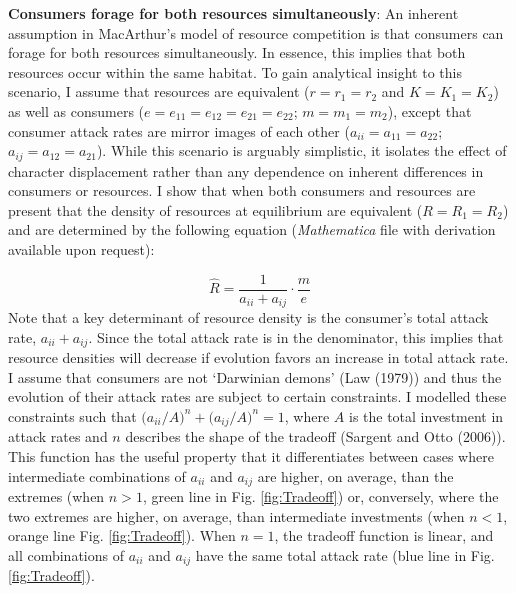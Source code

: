 \documentclass[11pt,]{article}
\begin{document}
\textbf{Consumers forage for both resources simultaneously}: An inherent
assumption in MacArthur's model of resource competition is that
consumers can forage for both resources simultaneously. In essence, this
implies that both resources occur within the same habitat. To gain
analytical insight to this scenario, I assume that resources are
equivalent (\(r=r_1=r_2\) and \(K=K_1=K_2\)) as well as consumers
(\(e=e_{11}=e_{12}=e_{21}=e_{22}\); \(m=m_1=m_2\)), except that consumer
attack rates are mirror images of each other (\(a_{ii}=a_{11}=a_{22}\);
\(a_{ij}=a_{12}=a_{21}\)). While this scenario is arguably simplistic,
it isolates the effect of character displacement rather than any
dependence on inherent differences in consumers or resources. I show
that when both consumers and resources are present that the density of
resources at equilibrium are equivalent (\(R=R_1=R_2\)) and are
determined by the following equation (\emph{Mathematica} file with
derivation available upon request):

\[\hat{R}=\frac{1}{a_{ii}+a_{ij}}\cdot\frac{m}{e}\] Note that a key
determinant of resource density is the consumer's total attack rate,
\(a_{ii}+a_{ij}\). Since the total attack rate is in the denominator,
this implies that resource densities will decrease if evolution favors
an increase in total attack rate. I assume that consumers are not
`Darwinian demons' (Law (1979)) and thus the evolution of their attack
rates are subject to certain constraints. I modelled these constraints
such that \(\big(a_{ii}/{A}\big)^n+\big(a_{ij}/{A}\big)^n=1\), where
\(A\) is the total investment in attack rates and \(n\) describes the
shape of the tradeoff (Sargent and Otto (2006)). This function has the
useful property that it differentiates between cases where intermediate
combinations of \(a_{ii}\) and \(a_{ij}\) are higher, on average, than
the extremes (when \(n>1\), green line in Fig. \ref{fig:Tradeoff}) or,
conversely, where the two extremes are higher, on average, than
intermediate investments (when \(n<1\), orange line Fig.
\ref{fig:Tradeoff}). When \(n=1\), the tradeoff function is linear, and
all combinations of \(a_{ii}\) and \(a_{ij}\) have the same total attack
rate (blue line in Fig. \ref{fig:Tradeoff}).
\end{document}
